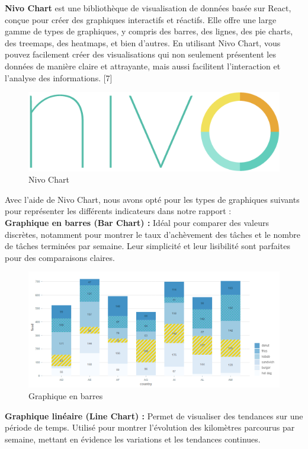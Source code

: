 \textbf{Nivo Chart} est une bibliothèque de visualisation de données basée sur React, conçue pour créer des graphiques interactifs et réactifs. Elle offre une large gamme de types de graphiques, y compris des barres, des lignes, des pie charts, des treemaps, des heatmaps, et bien d'autres. En utilisant Nivo Chart, vous pouvez facilement créer des visualisations qui non seulement présentent les données de manière claire et attrayante, mais aussi facilitent l'interaction et l'analyse des informations. [7]\\
\bigskip
\begin{figure}[ht]
    \centering \includegraphics[scale=0.19]{chap6.images/nivo.png}
    \caption{Nivo Chart}
    \label{Nivo Chart}
\end{figure}

\bigskip
\noindent
Avec l'aide de Nivo Chart, nous avons opté pour les types de graphiques suivants pour représenter les différents indicateurs dans notre rapport :\\

\noindent
\textbf{Graphique en barres (Bar Chart) :} Idéal pour comparer des valeurs discrètes, notamment pour montrer le taux d'achèvement des tâches et le nombre de tâches terminées par semaine. Leur simplicité et leur lisibilité sont parfaites pour des comparaisons claires.\\


\begin{figure}[ht]
    \centering \includegraphics[scale=0.6]{chap6.images/bar.png}
    \caption{Graphique en barres}
    \label{Graphique en barres}
\end{figure}
\newpage
\noindent
\textbf{Graphique linéaire (Line Chart) :} Permet de visualiser des tendances sur une période de temps. Utilisé pour montrer l'évolution des kilomètres parcourus par semaine, mettant en évidence les variations et les tendances continues.\\

